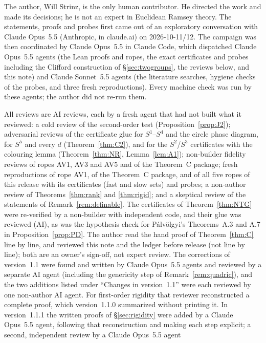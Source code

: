\documentclass[11pt]{amsart}
\theoremstyle{plain}
\theoremstyle{definition}
\begin{document}
The author, Will Strinz, is the only human contributor. He directed the work and
made its decisions; he is not an expert in Euclidean Ramsey theory. The statements, proofs and probes
first came out of an exploratory conversation with Claude Opus~5.5 (Anthropic, in claude.ai) on
2026-10-11/12. The campaign was then coordinated by Claude Opus~5.5 in Claude Code, which dispatched
Claude Opus~5.5 agents (the Lean proofs and ropes, the exact certificates and probes including the
Clifford construction of \S\ref{sec:twogroups}, the reviews below, and this note) and Claude Sonnet~5.5
agents (the literature searches, hygiene checks of the probes, and three fresh reproductions). Every
machine check was run by these agents; the author did not re-run them.

All reviews are AI reviews, each by a fresh agent that had not built what it reviewed: a cold review of the
second-order test (Proposition~\ref{prop:J2}); adversarial reviews of the certificate glue for $S^1$--$S^4$
and the circle phase diagram, for $S^5$ and every $d$ (Theorem~\ref{thm:C2}), and for the $S^2$/$S^3$
certificates with the colouring lemma (Theorem~\ref{thm:NR}, Lemma~\ref{lem:A1}); non-builder fidelity
reviews of ropes AV1, AV3 and AV5 and of the Theorem~C package; fresh reproductions of rope AV1, of the
Theorem~C package, and of all five ropes of this release with its certificates (fast and slow sets)
and probes; a non-author review of Theorems~\ref{thm:rank} and \ref{thm:rigid}; and a skeptical
review of the statements of Remark~\ref{rem:definable}. The certificates of
Theorem~\ref{thm:NTG} were re-verified by a non-builder with independent code, and their glue was
reviewed (AI), as was the hypothesis check for P\'alv\"olgyi's Theorems~A.3 and A.7 in
Proposition~\ref{prop:PD}. The author read
the hand proof of Theorem~\ref{thm:C} line by line, and reviewed this note and the ledger before
release (not line by line); both are an owner's sign-off, not expert review. The corrections of
version~1.1 were found and written by Claude Opus~5.5 agents and reviewed by a separate AI agent
(including the genericity step of Remark~\ref{rem:quadric}), and the two additions listed under
``Changes in version~1.1'' were each reviewed by one non-author AI agent. For first-order rigidity that
reviewer reconstructed a complete proof, which version~1.1.0 summarized without printing it. In
version~1.1.1 the written proofs of \S\ref{sec:rigidity} were added by a Claude Opus~5.5 agent, following
that reconstruction and making each step explicit; a second, independent review by a Claude Opus~5.5 agent
\end{document}
